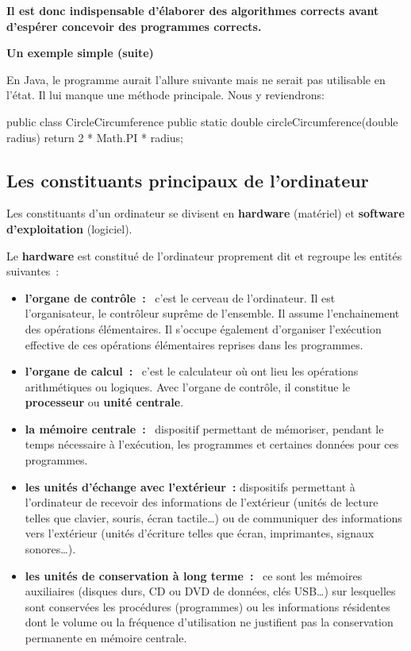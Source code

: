 			\textbf{%
			Il est donc indispensable d’élaborer des algorithmes corrects 
			avant d’espérer concevoir des programmes corrects.
			}

			\textbf{Un exemple simple (suite)}

			En Java, le programme aurait l'allure suivante mais ne serait pas
			utilisable en l'état. Il lui manque une méthode principale. Nous
			y reviendrons: 

			\begin{java}
public class CircleCircumference{
	public static double circleCircumference(double radius){
		return 2 * Math.PI * radius;
	}
}
			\end{java}

	
		\subsection{Les constituants principaux de l’ordinateur}
		
			Les constituants d’un ordinateur 
			se divisent en \textbf{hardware} (matériel) 
			et \textbf{software d’exploitation} (logiciel).
			
			Le \textbf{hardware} est constitué 
			de l’ordinateur proprement dit 
			et regroupe les entités suivantes~:
	
			\begin{itemize}
			\item
				\textbf{l’organe de contrôle~:}~
				c’est le cerveau de l’ordinateur. 
				Il est l’organisateur, 
				le contrôleur suprême de l’ensemble. 
				Il assume l’enchainement des opérations élémentaires. 
				Il s’occupe également d’organiser l’exécution effective
				de ces opérations élémentaires reprises dans les programmes.
			\item
				\textbf{l’organe de calcul~:}~
				c’est le calculateur 
				où ont lieu les opérations arithmétiques ou logiques. 
				Avec l’organe de contrôle, 
				il constitue le \textbf{processeur} 
				ou \textbf{unité centrale}.
			\item
				\textbf{la mémoire centrale~:}~
				dispositif permettant de mémoriser,
				pendant le temps nécessaire à l’exécution, 
				les programmes et certaines données pour ces programmes.
			\item
				\textbf{les unités d’échange avec l’extérieur~:} 
				dispositifs permettant à l’ordinateur de recevoir 
				des informations de l’extérieur 
				(unités de lecture telles que clavier, souris, écran tactile\dots) 
				ou de communiquer des informations vers l’extérieur 
				(unités d’écriture telles que écran, imprimantes, signaux sonores\dots).
			\item
				\textbf{les unités de conservation à long terme~:}~
				ce sont les mémoires auxiliaires 
				(disques durs, CD ou DVD de données, clés USB\dots) 
				sur lesquelles sont conservées les procédures (programmes) 
				ou les informations résidentes dont le volume 
				ou la fréquence d’utilisation ne justifient pas 
				la conservation permanente en mémoire centrale.
			\end{itemize}
			
